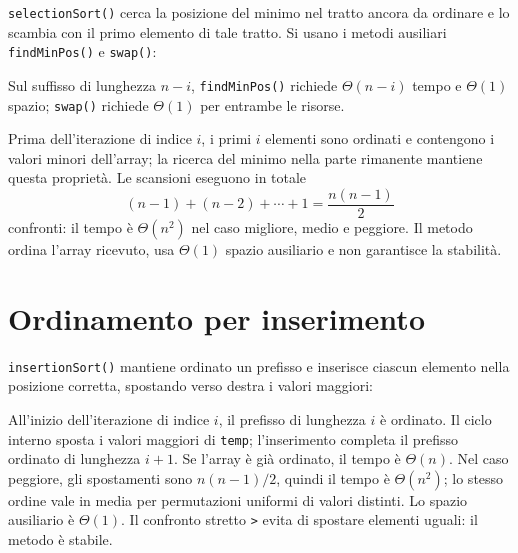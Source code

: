 \texttt{selectionSort()} cerca la posizione del minimo nel tratto
ancora da ordinare e lo scambia con il primo elemento di tale
tratto. Si usano i metodi ausiliari \texttt{findMinPos()} e
\texttt{swap()}:

\noindent
\begin{minipage}{\linewidth}

\end{minipage}

\noindent
\begin{minipage}{\linewidth}

\end{minipage}

Sul suffisso di lunghezza \(n-i\), \texttt{findMinPos()} richiede
\(\Theta(n-i)\) tempo e \(\Theta(1)\) spazio; \texttt{swap()}
richiede \(\Theta(1)\) per entrambe le risorse.

Prima dell'iterazione di indice \(i\), i primi \(i\) elementi sono
ordinati e contengono i valori minori dell'array; la ricerca
del minimo nella parte rimanente mantiene questa proprietà.
Le scansioni eseguono in totale
\[
  (n-1)+(n-2)+\cdots+1=\frac{n(n-1)}{2}
\]
confronti: il tempo è \(\Theta(n^2)\) nel caso migliore, medio e
peggiore. Il metodo ordina l'array ricevuto, usa \(\Theta(1)\)
spazio ausiliario e non garantisce la stabilità.

\section{Ordinamento per inserimento}
\label{sec:fi-java-alg-inserimento}

\texttt{insertionSort()} mantiene ordinato un prefisso e inserisce
ciascun elemento nella posizione corretta, spostando verso destra
i valori maggiori:

\noindent
\begin{minipage}{\linewidth}

\end{minipage}

All'inizio dell'iterazione di indice \(i\), il prefisso di
lunghezza \(i\) è ordinato. Il ciclo interno sposta i valori maggiori
di \texttt{temp}; l'inserimento completa il prefisso ordinato di
lunghezza \(i+1\). Se l'array è già ordinato, il tempo è
\(\Theta(n)\). Nel caso peggiore, gli spostamenti sono
\(n(n-1)/2\), quindi il tempo è \(\Theta(n^2)\); lo stesso ordine
vale in media per permutazioni uniformi di valori distinti.
Lo spazio ausiliario è \(\Theta(1)\). Il confronto stretto
\lstinline|>| evita di spostare elementi uguali: il metodo è stabile.

